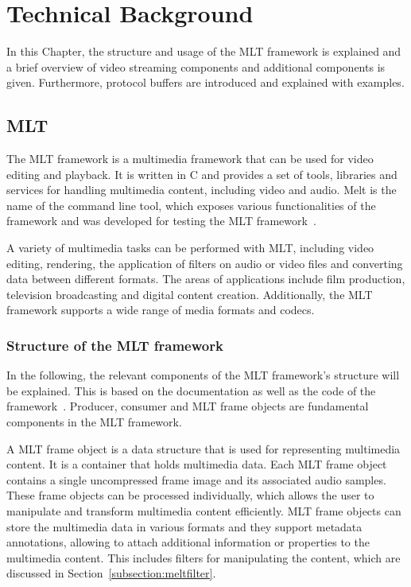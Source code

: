 \documentclass[../MasterThesis.tex]{subfiles}
\begin{document}
	
	

\newpage

\section{Technical Background} \label{section:technicalbackground}


In this Chapter, the structure and usage of the MLT framework is explained and a brief overview of video streaming components and additional components is given. Furthermore, protocol buffers are introduced and explained with examples.


\subsection{MLT} \label{subsection:melt}

The MLT framework is a multimedia framework that can be used for video editing and playback. It is written in C and provides a set of tools, libraries and services for handling multimedia content, including video and audio. Melt is the name of the command line tool, which exposes various functionalities of the framework and was developed for testing the MLT framework~\cite{melt}. 




A variety of multimedia tasks can be performed with MLT, including video editing, rendering, the application of filters on audio or video files and converting data between different formats.
The areas of applications include film production, television broadcasting and digital content creation. 
Additionally, the MLT framework supports a wide range of media formats and codecs.




\subsubsection*{Structure of the MLT framework}


In the following, the relevant components of the MLT framework's structure will be explained. This is based on the documentation as well as the code of the framework~\cite{melt, melt_code}.
%
Producer, consumer and MLT frame objects are fundamental components in the MLT framework.

A MLT frame object is a data structure that is used for representing multimedia content. 
It is a container that holds multimedia data. Each MLT frame object contains a single uncompressed frame image and its associated audio samples. These frame objects can be processed individually, which allows the user to manipulate and transform multimedia content efficiently.
MLT frame objects can store the multimedia data in various formats and they support metadata annotations, allowing to attach additional information or properties to the multimedia content. This includes filters for manipulating the content, which are discussed in Section~\ref{subsection:meltfilter}.
\end{document}
